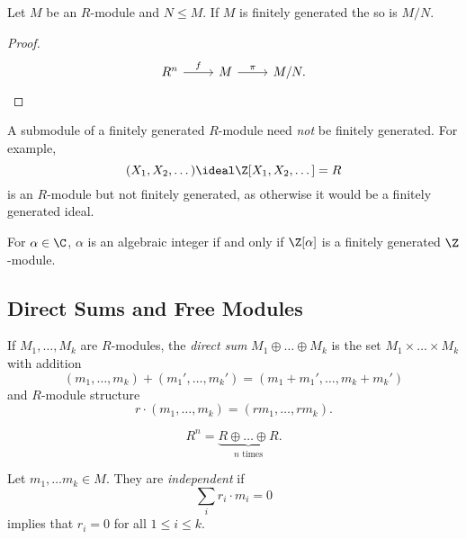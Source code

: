 \documentclass[a4paper]{article}
\theoremstyle{definition}
\begin{document}
\begin{corollary}
  Let \(M\) be an \(R\)-module and \(N \leq M\). If \(M\) is finitely generated the so is \(M/N\).
\end{corollary}

\begin{proof}
  \[
    \begin{tikzcd}
      R^n \ar[r, "f"] & M \ar[r, "\pi"] & M/N.
    \end{tikzcd}
  \]
\end{proof}

\begin{note}
  A submodule of a finitely generated \(R\)-module need \emph{not} be finitely generated. For example,
  \[
    (X_1, X_2, \dots) \ideal \Z[X_1, X_2, \dots] = R
  \]
  is an \(R\)-module but not finitely generated, as otherwise it would be a finitely generated ideal.
\end{note}

\begin{eg}
  For \(\alpha \in \C\), \(\alpha\) is an algebraic integer if and only if \(\Z[\alpha]\) is a finitely generated \(\Z\)-module.
\end{eg}

\subsection{Direct Sums and Free Modules}

\begin{definition}
  If \(M_1, \dots, M_k\) are \(R\)-modules, the \emph{direct sum} \(M_1 \oplus \dots \oplus M_k\) is the set \(M_1 \times \dots \times M_k\) with addition
  \[
    (m_1, \dots, m_k) + (m_1', \dots, m_k') = (m_1 + m_1', \dots, m_k + m_k')
  \]
  and \(R\)-module structure
  \[
    r \cdot (m_1, \dots, m_k) = (rm_1, \dots, rm_k).
  \]
\end{definition}

\begin{eg}
  \[
    R^n = \underbrace{R \oplus \dots \oplus R}_{n \text{ times}}.
  \]
\end{eg}

\begin{definition}[Independence]
  Let \(m_1, \dots m_k \in M\). They are \emph{independent} if
  \[
    \sum_i r_i \cdot m_i = 0
  \]
  implies that \(r_i = 0\) for all \(1 \leq i \leq k\).
\end{definition}
\end{document}
